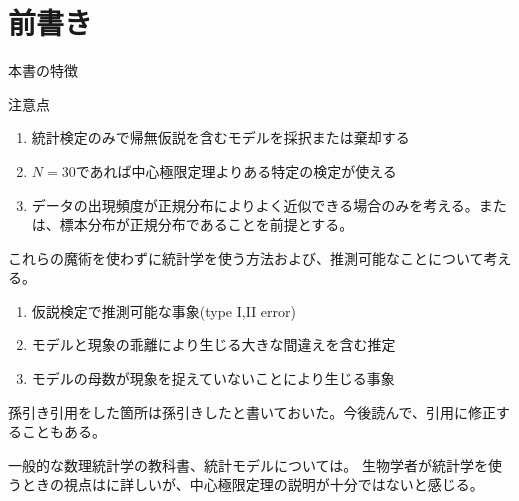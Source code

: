 
\section{前書き}\label{introduction}



本書の特徴

注意点





\begin{enumerate}
    \item 統計検定のみで帰無仮説を含むモデルを採択または棄却する
    \item $N=30$であれば中心極限定理よりある特定の検定が使える
    \item データの出現頻度が正規分布によりよく近似できる場合のみを考える。または、標本分布が正規分布であることを前提とする。
\end{enumerate}
これらの魔術を使わずに統計学を使う方法および、推測可能なことについて考える。


\begin{enumerate}
    \item 仮説検定で推測可能な事象(type I,II error)
    \item モデルと現象の乖離により生じる大きな間違えを含む推定
    \item モデルの母数が現象を捉えていないことにより生じる事象
\end{enumerate}

孫引き引用をした箇所は孫引きしたと書いておいた。今後読んで、引用に修正することもある。

一般的な数理統計学の教科書\cite{2012統計科学の基礎,199005数理統計,1973確率,1963数理統計学,2009統計的機械学習,2005確率と統計,2016統計学,2017現代数理統計学の基礎,2020現代数理統計学}、統計モデルについては\cite{2012データ解析のための統計モデリング入門}。
生物学者が統計学を使うときの視点は\cite{2018統計思考の世界}に詳しいが、中心極限定理の説明が十分ではないと感じる。
